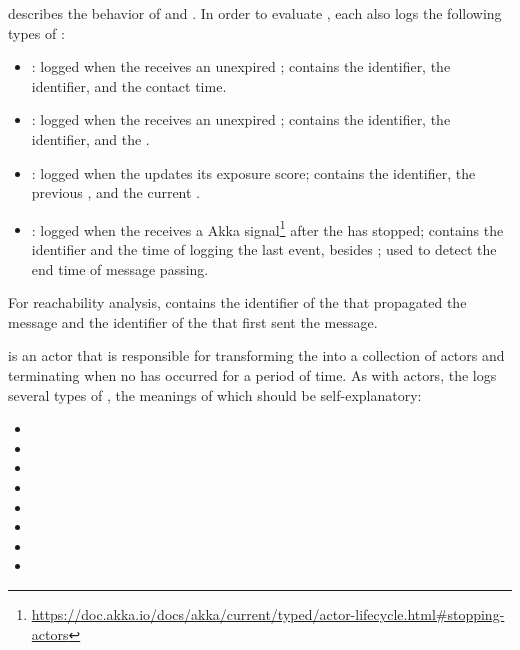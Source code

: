  describes the behavior of  and . In order to evaluate , each  also logs the following types of :
\begin{itemize}
  \item {}: logged when the  receives an unexpired ; contains the  identifier, the  identifier, and the contact time.
  \item {}: logged when the  receives an unexpired ; contains the  identifier, the  identifier, and the .
  \item {}: logged when the  updates its exposure score; contains the  identifier, the previous , and the current .
  \item {}: logged when the  receives a  Akka signal\footnote{\url{https://doc.akka.io/docs/akka/current/typed/actor-lifecycle.html\#stopping-actors}} after the  has stopped; contains the  identifier and the time of logging the last event, besides ; used to detect the end time of message passing.
\end{itemize}
For reachability analysis,  contains the identifier of the  that propagated the message and the identifier of the  that first sent the message.

 is an actor that is responsible for transforming the  into a collection of  actors and terminating when no  has occurred for a period of time. As with  actors, the  logs several types of , the meanings of which should be self-explanatory:

\begin{multicols}{2}
\begin{itemize}
  \item {}
  \item {}
  \item {}
  \item {}
  \item {}
  \item {}
  \item {}
  \item {}
\end{itemize}
\end{multicols}

